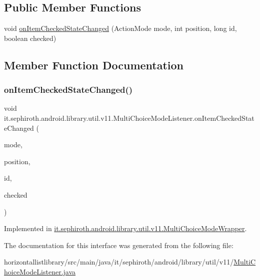 \subsection*{Public Member Functions}
\begin{DoxyCompactItemize}
\item 
void \hyperlink{interfaceit_1_1sephiroth_1_1android_1_1library_1_1util_1_1v11_1_1_multi_choice_mode_listener_a449f3d52f861a2834035f100b29393e6}{on\+Item\+Checked\+State\+Changed} (Action\+Mode mode, int position, long id, boolean checked)
\end{DoxyCompactItemize}


\subsection{Member Function Documentation}
\mbox{\label{interfaceit_1_1sephiroth_1_1android_1_1library_1_1util_1_1v11_1_1_multi_choice_mode_listener_a449f3d52f861a2834035f100b29393e6}} 
\subsubsection{\texorpdfstring{on\+Item\+Checked\+State\+Changed()}{onItemCheckedStateChanged()}}
{\footnotesize\ttfamily void it.\+sephiroth.\+android.\+library.\+util.\+v11.\+Multi\+Choice\+Mode\+Listener.\+on\+Item\+Checked\+State\+Changed (\begin{DoxyParamCaption}\item[{Action\+Mode}]{mode,  }\item[{int}]{position,  }\item[{long}]{id,  }\item[{boolean}]{checked }\end{DoxyParamCaption})}



Implemented in \hyperlink{classit_1_1sephiroth_1_1android_1_1library_1_1util_1_1v11_1_1_multi_choice_mode_wrapper_a6981e606cfdd2ce993c09ea6d0b24605}{it.\+sephiroth.\+android.\+library.\+util.\+v11.\+Multi\+Choice\+Mode\+Wrapper}.



The documentation for this interface was generated from the following file\+:\begin{DoxyCompactItemize}
\item 
horizontallistlibrary/src/main/java/it/sephiroth/android/library/util/v11/\hyperlink{_multi_choice_mode_listener_8java}{Multi\+Choice\+Mode\+Listener.\+java}\end{DoxyCompactItemize}
